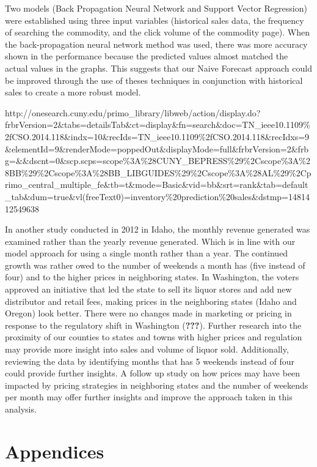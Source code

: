 \documentclass[]{elsarticle} %
\begin{document}
Two models (Back Propagation Neural Network and Support Vector
Regression) were established using three input variables (historical
sales data, the frequency of searching the commodity, and the click
volume of the commodity page). When the back-propagation neural network
method was used, there was more accuracy shown in the performance
because the predicted values almost matched the actual values in the
graphs. This suggests that our Naive Forecast approach could be improved
through the use of theses techniques in conjunction with historical
sales to create a more robust model.

http://onesearch.cuny.edu/primo\_library/libweb/action/display.do?frbrVersion=2\&tabs=detailsTab\&ct=display\&fn=search\&doc=TN\_ieee10.1109\%2fCSO.2014.118\&indx=10\&recIds=TN\_ieee10.1109\%2fCSO.2014.118\&recIdxs=9\&elementId=9\&renderMode=poppedOut\&displayMode=full\&frbrVersion=2\&frbg=\&\&dscnt=0\&scp.scps=scope\%3A\%28CUNY\_BEPRESS\%29\%2Cscope\%3A\%28BB\%29\%2Cscope\%3A\%28BB\_LIBGUIDES\%29\%2Cscope\%3A\%28AL\%29\%2Cprimo\_central\_multiple\_fe\&tb=t\&mode=Basic\&vid=bb\&srt=rank\&tab=default\_tab\&dum=true\&vl(freeText0)=inventory\%20prediction\%20sales\&dstmp=1481412549638

In another study conducted in 2012 in Idaho, the monthly revenue
generated was examined rather than the yearly revenue generated. Which
is in line with our model approach for using a single month rather than
a year. The continued growth was rather owed to the number of weekends a
month has (five instead of four) and to the higher prices in neighboring
states. In Washington, the voters approved an initiative that led the
state to sell its liquor stores and add new distributor and retail fees,
making prices in the neighboring states (Idaho and Oregon) look better.
There were no changes made in marketing or pricing in response to the
regulatory shift in Washington ({\textbf{???}}). Further research into
the proximity of our counties to states and towns with higher prices and
regulation may provide more insight into sales and volume of liquor
sold. Additionally, reviewing the data by identifying months that has 5
weekends instead of four could provide further insights. A follow up
study on how prices may have been impacted by pricing strategies in
neighboring states and the number of weekends per month may offer
further insights and improve the approach taken in this analysis.

\newpage

\section{Appendices}\label{appendices}
\end{document}
